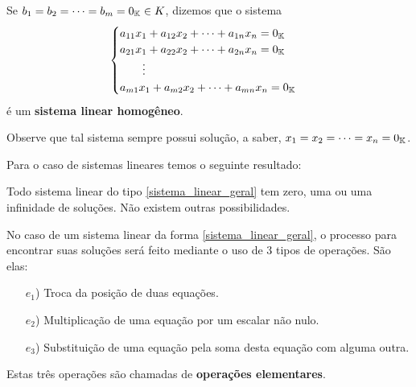 Se $b_1 = b_2 = \cdots = b_m = 0_{\mathbb{K}} \in K$,  dizemos que o sistema
\begin{equation}\label{sistemalinearhomogeneo}\index{Sistema Linear}
    \begin{cases}
        a_{11}x_1 + a_{12}x_2 + \cdots + a_{1n}x_n = 0_\cp{K}\\
        a_{21}x_1 + a_{22}x_2 + \cdots + a_{2n}x_n = 0_\cp{K}\\
        \qquad \vdots\\
        a_{m1}x_1 + a_{m2}x_2 + \cdots + a_{mn}x_n = 0_\cp{K}
    \end{cases}
\end{equation}
\'e um \textbf{sistema linear homog\^eneo}. 

Observe que tal sistema sempre possui solu\c{c}\~ao,  a saber, $x_1 = x_2 = \cdots = x_n = 0_{\mathbb{K}}$.

Para o caso de sistemas lineares temos o seguinte resultado:

\begin{teorema}
    Todo sistema linear do tipo \eqref{sistema_linear_geral} tem zero,  uma  ou uma infinidade de soluções.  Não existem outras possibilidades.
\end{teorema}

No caso de um sistema linear da forma \eqref{sistema_linear_geral},  o processo para encontrar suas soluções ser\'a feito mediante o uso de 3 tipos de opera\c{c}\~oes.  S\~ao elas:
\begin{itemize}
\item[$e_1$)] Troca da posi\c{c}\~ao de duas equa\c{c}\~oes.
\item[$e_2$)] Multiplica\c{c}\~ao de uma equa\c{c}\~ao por um escalar n\~ao nulo.
\item[$e_3$)] Substitui\c{c}\~ao de uma equa\c{c}\~ao pela soma desta equa\c{c}\~ao com alguma outra.
\end{itemize}

Estas tr\^es opera\c{c}\~oes s\~ao chamadas de  \textbf{opera\c{c}\~oes elementares}.


